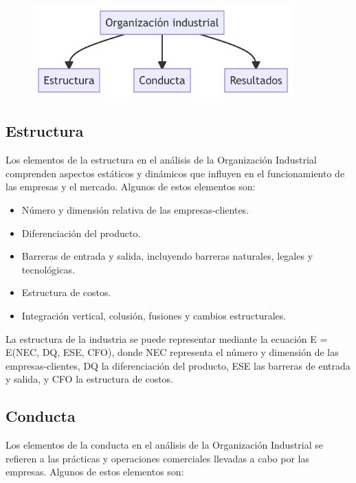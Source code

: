 \documentclass[
  letterpaper,
  DIV=11,
  numbers=noendperiod]{scrartcl}
\providecommand{\tightlist}{%
  \setlength{\itemsep}{0pt}\setlength{\parskip}{0pt}}\usepackage{longtable,booktabs,array}
\begin{document}
\begin{figure}[H]

{\centering \includegraphics[width=3.94in,height=1.4in]{index_files/figure-latex/mermaid-figure-1.png}

}

\end{figure}

\hypertarget{estructura}{%
\subsection{Estructura}\label{estructura}}

Los elementos de la estructura en el análisis de la Organización
Industrial comprenden aspectos estáticos y dinámicos que influyen en el
funcionamiento de las empresas y el mercado. Algunos de estos elementos
son:

\begin{itemize}
\tightlist
\item
  Número y dimensión relativa de las empresas-clientes.
\item
  Diferenciación del producto.
\item
  Barreras de entrada y salida, incluyendo barreras naturales, legales y
  tecnológicas.
\item
  Estructura de costos.
\item
  Integración vertical, colusión, fusiones y cambios estructurales.
\end{itemize}

La estructura de la industria se puede representar mediante la ecuación
E = E(NEC, DQ, ESE, CFO), donde NEC representa el número y dimensión de
las empresas-clientes, DQ la diferenciación del producto, ESE las
barreras de entrada y salida, y CFO la estructura de costos.

\hypertarget{conducta}{%
\subsection{Conducta}\label{conducta}}

Los elementos de la conducta en el análisis de la Organización
Industrial se refieren a las prácticas y operaciones comerciales
llevadas a cabo por las empresas. Algunos de estos elementos son:
\end{document}

